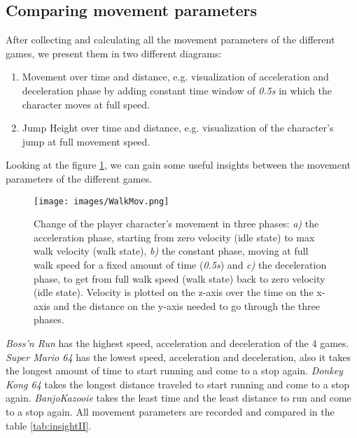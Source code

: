 \documentclass[letterpaper, 10 pt, conference]{ieeeconf}  %
\begin{document}
\subsection{Comparing movement parameters}

After collecting and calculating all the movement parameters of the different games, we present them in two different diagrams:

\begin{enumerate}
    \item Movement over time and distance, e.g. visualization of acceleration and deceleration phase by adding constant time window of \textit{0.5s} in which the character moves at full speed.
    \item Jump Height over time and distance, e.g. visualization of the character's jump at full movement speed.
\end{enumerate}

Looking at the figure \ref{fig:walk_mov}, we can gain some useful insights between the movement parameters of the different games.

\begin{figure}[!ht]
    \caption{ Change of the player character's movement in three phases:
    \textit{a)} the acceleration phase, starting from zero velocity (idle state) to max walk velocity (walk state), \textit{b)} the constant phase, moving at full walk speed for a fixed amount of time (\textit{0.5s}) and 
    \textit{c)} the deceleration phase, to get from full walk speed (walk state) back to zero velocity (idle state).
    Velocity is plotted on the z-axis over the time on the x-axis and the distance on the y-axis needed to go through the three phases. 
    }
    \centering
    \texttt{[image: images/WalkMov.png]}
    \label{fig:walk_mov}
\end{figure}

\textit{Boss'n Run} has the highest speed, acceleration and deceleration of the 4 games.
\textit{Super Mario 64} has the lowest speed, acceleration and deceleration, also it takes the longest amount of time to start running and come to a stop again.
\textit{Donkey Kong 64} takes the longest distance traveled to start running and come to a stop again. 
\textit{BanjoKazooie} takes the least time and the least distance to run and come to a stop again.
All movement parameters are recorded and compared in the table \ref{tab:insightII}.
\end{document}
